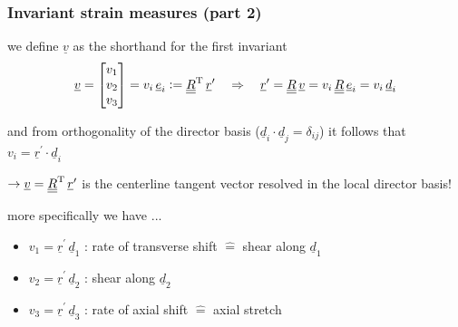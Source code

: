 \begin{frame}
  \frametitle{Invariant strain measures (part 2)}
  we define $\underline{v}$ as the shorthand for the first invariant
  \begin{displaymath}
    \underline{v} =
    \begin{bmatrix} v_1 \\ v_2 \\ v_3 \end{bmatrix} = 
    v_i \, \underline{e}_i :=
    \underline{\underline{R}}^{\mathrm{T}} \, \underline{r}^{\prime}
    \quad \Rightarrow \quad
    \underline{r}^{\prime} =
    \underline{\underline{R}} \, \underline{v} =
    v_i \, \underline{\underline{R}} \, \underline{e}_i =
    v_i \, \underline{d}_i
  \end{displaymath}
  
  and from orthogonality of the director basis ($\underline{d}_i \cdot \underline{d}_j = \delta_{ij}$) it follows that $v_i = \underline{r}^{\prime} \cdot \underline{d}_i$
  
  \vspace{0.3em}
  $\rightarrow \underline{v} = \underline{\underline{R}}^{\mathrm{T}} \, \underline{r}^{\prime}$ is the centerline tangent vector resolved in the local director basis!
  
  \vspace{1em}
  more specifically we have ...
  \begin{itemize}
    \item $v_1 = \underline{r}^{\prime} \, \underline{d}_1$ : rate of transverse shift $\hat{=}$ shear along $\underline{d}_1$
    \item $v_2 = \underline{r}^{\prime} \, \underline{d}_2$ : shear along $\underline{d}_2$
    \item $v_3 = \underline{r}^{\prime} \, \underline{d}_3$ : rate of axial shift $\hat{=}$ axial stretch 
  \end{itemize}
\end{frame}


